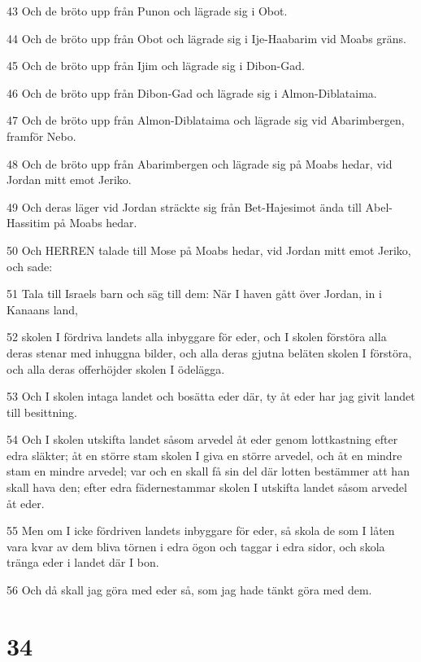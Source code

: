 \par 43 Och de bröto upp från Punon och lägrade sig i Obot.
\par 44 Och de bröto upp från Obot och lägrade sig i Ije-Haabarim vid Moabs gräns.
\par 45 Och de bröto upp från Ijim och lägrade sig i Dibon-Gad.
\par 46 Och de bröto upp från Dibon-Gad och lägrade sig i Almon-Diblataima.
\par 47 Och de bröto upp från Almon-Diblataima och lägrade sig vid Abarimbergen, framför Nebo.
\par 48 Och de bröto upp från Abarimbergen och lägrade sig på Moabs hedar, vid Jordan mitt emot Jeriko.
\par 49 Och deras läger vid Jordan sträckte sig från Bet-Hajesimot ända till Abel-Hassitim på Moabs hedar.
\par 50 Och HERREN talade till Mose på Moabs hedar, vid Jordan mitt emot Jeriko, och sade:
\par 51 Tala till Israels barn och säg till dem: När I haven gått över Jordan, in i Kanaans land,
\par 52 skolen I fördriva landets alla inbyggare för eder, och I skolen förstöra alla deras stenar med inhuggna bilder, och alla deras gjutna beläten skolen I förstöra, och alla deras offerhöjder skolen I ödelägga.
\par 53 Och I skolen intaga landet och bosätta eder där, ty åt eder har jag givit landet till besittning.
\par 54 Och I skolen utskifta landet såsom arvedel åt eder genom lottkastning efter edra släkter; åt en större stam skolen I giva en större arvedel, och åt en mindre stam en mindre arvedel; var och en skall få sin del där lotten bestämmer att han skall hava den; efter edra fädernestammar skolen I utskifta landet såsom arvedel åt eder.
\par 55 Men om I icke fördriven landets inbyggare för eder, så skola de som I låten vara kvar av dem bliva törnen i edra ögon och taggar i edra sidor, och skola tränga eder i landet där I bon.
\par 56 Och då skall jag göra med eder så, som jag hade tänkt göra med dem.

\chapter{34}

